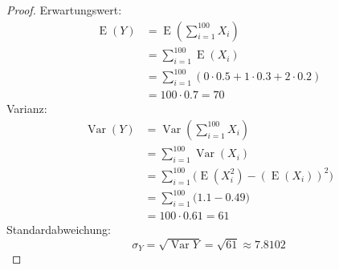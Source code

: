 \documentclass[a4paper]{scrartcl}
\newcommand{\e}{\operatorname{E}}
\newcommand{\var}{\operatorname{Var}}
\begin{document}
\begin{enumerate}[label=\bfseries\arabic*.]
\begin{enumerate}[label=(\alph*)]
\begin{proof}
                    Erwartungswert:
                    \begin{equation*}
                        \begin{split}
                            \e(Y) &= \e\left( \sum_{i=1}^{100} X_i \right) \\
                                  &= \sum_{i=1}^{100} \e(X_i) \\
                                  &= \sum_{i=1}^{100} (0 \cdot \num{0,5} + 1
                                     \cdot \num{0,3} + 2 \cdot \num{0,2}) \\
                                  &= 100 \cdot \num{0,7} = 70
                        \end{split}
                    \end{equation*}
                    Varianz:
                    \begin{equation*}
                        \begin{split}
                            \var(Y)
                            &= \var\left( \sum_{i=1}^{100} X_i \right) \\
                            &= \sum_{i=1}^{100} \var(X_i) \\
                            &= \sum_{i=1}^{100}
                               \Big( \e(X_i^2) - (\e(X_i))^2 \Big) \\
                            &= \sum_{i=1}^{100}
                               \Big( \num{1,1} - \num{0,49} \Big) \\
                            &= 100 \cdot \num{0,61} = 61
                        \end{split}
                    \end{equation*}
                    Standardabweichung:
                    \begin{equation*}
                        \sigma_Y = \sqrt{\var{Y}}
                        = \sqrt{61} \approx \num{7,8102}
                    \end{equation*}
                \end{proof}


\end{enumerate}
\end{enumerate}
\end{document}
